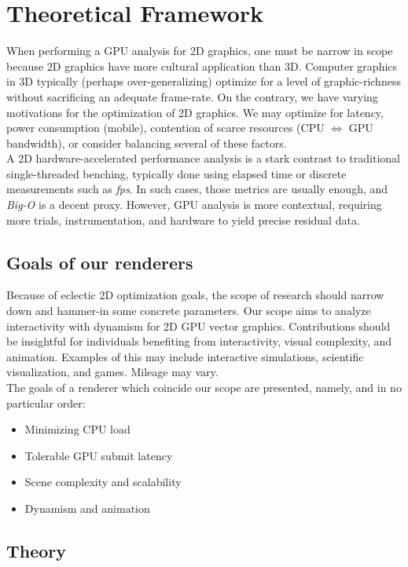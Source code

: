 \section{Theoretical Framework}

When performing a GPU analysis for 2D graphics, one must be narrow in scope because 2D graphics have more cultural application than 3D. Computer graphics in 3D typically (perhaps over-generalizing) optimize for a level of graphic-richness without sacrificing an adequate frame-rate. On the contrary, we have varying motivations for the optimization of 2D graphics. We may optimize for latency, power consumption (mobile), contention of scarce resources (CPU $\Leftrightarrow$ GPU bandwidth), or consider balancing several of these factors.\\

A 2D hardware-accelerated performance analysis is a stark contrast to traditional single-threaded benching, typically done using elapsed time or discrete measurements such as \emph{fps}. In such cases, those metrics are usually enough, and \emph{Big-O} is a decent proxy. However, GPU analysis is more contextual, requiring more trials, instrumentation, and hardware to yield precise residual data.

\subsection{Goals of our renderers}
Because of eclectic 2D optimization goals, the scope of research should narrow down and hammer-in some concrete parameters. Our scope aims to analyze interactivity with dynamism for 2D GPU vector graphics. Contributions should be insightful for individuals benefiting from interactivity, visual complexity, and animation. Examples of this may include interactive simulations, scientific visualization, and games. Mileage may vary.\\

The goals of a renderer which coincide our scope are presented, namely, and in no particular order:
\begin{itemize}
  \item Minimizing CPU load
  \item Tolerable GPU submit latency
  \item Scene complexity and scalability
  \item Dynamism and animation
\end{itemize}

\subsection{Theory}

